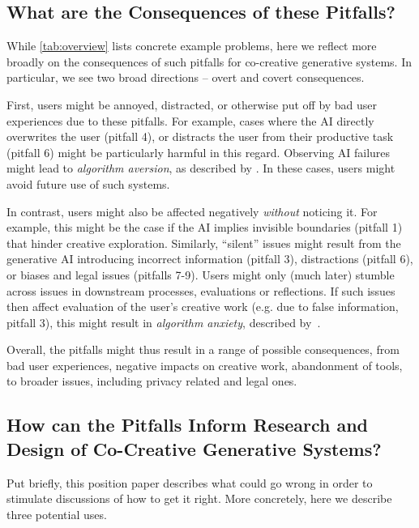 \documentclass[
twocolumn,
]{ceurart}
\begin{document}
\subsection{What are the Consequences of these Pitfalls?}

While \cref{tab:overview} lists concrete example problems, here we reflect more broadly on the consequences of such pitfalls for co-creative generative systems. In particular, we see two broad directions -- overt and covert consequences.

First, users might be annoyed, distracted, or otherwise put off by bad user experiences due to these pitfalls. For example, cases where the AI directly overwrites the user (pitfall 4), or distracts the user from their productive task (pitfall 6) might be particularly harmful in this regard. Observing AI failures might lead to \textit{algorithm aversion}, as described by \citet{Dietvorst2015}. In these cases, users might avoid future use of such systems.

In contrast, users might also be affected negatively \textit{without} noticing it. For example, this might be the case if the AI implies invisible boundaries (pitfall 1) that hinder creative exploration. Similarly, ``silent'' issues might result from the generative AI introducing incorrect information (pitfall 3), distractions (pitfall 6), or biases and legal issues (pitfalls 7-9). Users might only (much later) stumble across issues in downstream processes, evaluations or reflections. If such issues then affect evaluation of the user's creative work (e.g. due to false information, pitfall 3), this might result in \textit{algorithm anxiety}, described by~\citet{Jhaver2018}. 

Overall, the pitfalls might thus result in a range of possible consequences, from bad user experiences, negative impacts on creative work, abandonment of tools, to broader issues, including privacy related and legal ones.


\subsection{How can the Pitfalls Inform Research and Design of Co-Creative Generative Systems?}

Put briefly, this position paper describes what could go wrong in order to stimulate discussions of how to get it right. More concretely, here we describe three potential uses.
\end{document}
